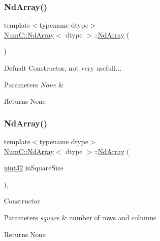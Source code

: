 \subsubsection{\texorpdfstring{Nd\+Array()}{NdArray()}\hspace{0.1cm}{\footnotesize\ttfamily [1/12]}}
{\footnotesize\ttfamily template$<$typename dtype$>$ \\
\mbox{\hyperlink{class_num_c_1_1_nd_array}{Num\+C\+::\+Nd\+Array}}$<$ dtype $>$\+::\mbox{\hyperlink{class_num_c_1_1_nd_array}{Nd\+Array}} (\begin{DoxyParamCaption}{ }\end{DoxyParamCaption})\hspace{0.3cm}{\ttfamily [inline]}}

Defualt Constructor, not very usefull...


\begin{DoxyParams}{Parameters}
{\em None} & \\
\hline
\end{DoxyParams}
\begin{DoxyReturn}{Returns}
None 
\end{DoxyReturn}
\mbox{\label{class_num_c_1_1_nd_array_abe77a5faaf421f07b4fd08228fc7214b}} 
\subsubsection{\texorpdfstring{Nd\+Array()}{NdArray()}\hspace{0.1cm}{\footnotesize\ttfamily [2/12]}}
{\footnotesize\ttfamily template$<$typename dtype$>$ \\
\mbox{\hyperlink{class_num_c_1_1_nd_array}{Num\+C\+::\+Nd\+Array}}$<$ dtype $>$\+::\mbox{\hyperlink{class_num_c_1_1_nd_array}{Nd\+Array}} (\begin{DoxyParamCaption}\item[{\mbox{\hyperlink{namespace_num_c_ae685802ca6d3035f2b400b081e3953fa}{uint32}}}]{in\+Square\+Size }\end{DoxyParamCaption})\hspace{0.3cm}{\ttfamily [inline]}, {\ttfamily [explicit]}}

Constructor


\begin{DoxyParams}{Parameters}
{\em square} & number of rows and columns \\
\hline
\end{DoxyParams}
\begin{DoxyReturn}{Returns}
None 
\end{DoxyReturn}
\mbox{\label{class_num_c_1_1_nd_array_a18907a1e1a932dea4d133656c765a2c8}} 
